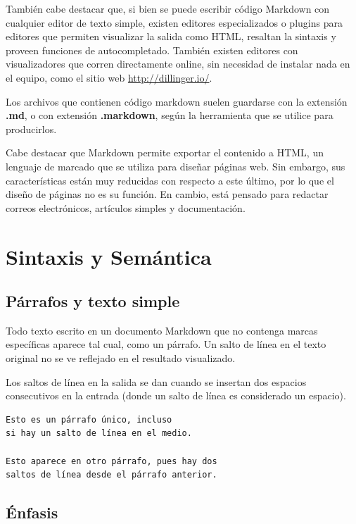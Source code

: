 También cabe destacar que, si bien se puede escribir código Markdown con cualquier
editor de texto simple, existen editores especializados o plugins para editores
que permiten visualizar la salida como HTML, resaltan la sintaxis y proveen
funciones de autocompletado. También existen editores con visualizadores que
corren directamente online, sin necesidad de instalar nada en el equipo,
como el sitio web \href{http://dillinger.io/}{http://dillinger.io/}.

Los archivos que contienen código markdown suelen guardarse con la extensión
\textbf{.md}, o con extensión \textbf{.markdown}, según la herramienta que se
utilice para producirlos.

Cabe destacar que Markdown permite exportar el contenido a HTML, un lenguaje
de marcado que se utiliza para diseñar páginas web. Sin embargo, sus características
están muy reducidas con respecto a este último, por lo que el diseño de páginas
no es su función. En cambio, está pensado para redactar correos electrónicos,
artículos simples y documentación.

\section{Sintaxis y Semántica}

\subsection*{Párrafos y texto simple}

Todo texto escrito en un documento Markdown que no contenga marcas específicas
aparece tal cual, como un párrafo. Un salto de línea en el texto original
no se ve reflejado en el resultado visualizado.

Los saltos de línea en la salida se dan cuando se insertan dos espacios
consecutivos en la entrada (donde un salto de línea es considerado un espacio).

\begin{lstlisting}[language=Markdown]
Esto es un párrafo único, incluso
si hay un salto de línea en el medio.

Esto aparece en otro párrafo, pues hay dos
saltos de línea desde el párrafo anterior.
\end{lstlisting}

\subsection*{Énfasis}

